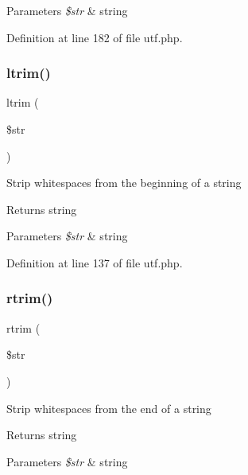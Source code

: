 \begin{DoxyParams}{Parameters}
{\em \$str} & string \\
\hline
\end{DoxyParams}


Definition at line 182 of file utf.\+php.

\hypertarget{class_u_t_f_a36a0151237d3480734de64933f769843}{}\label{class_u_t_f_a36a0151237d3480734de64933f769843} 
\subsubsection{\texorpdfstring{ltrim()}{ltrim()}}
{\footnotesize\ttfamily ltrim (\begin{DoxyParamCaption}\item[{}]{\$str }\end{DoxyParamCaption})}

Strip whitespaces from the beginning of a string \begin{DoxyReturn}{Returns}
string 
\end{DoxyReturn}

\begin{DoxyParams}{Parameters}
{\em \$str} & string \\
\hline
\end{DoxyParams}


Definition at line 137 of file utf.\+php.

\hypertarget{class_u_t_f_afa81b944f8aed770a266a9884e3e5049}{}\label{class_u_t_f_afa81b944f8aed770a266a9884e3e5049} 
\subsubsection{\texorpdfstring{rtrim()}{rtrim()}}
{\footnotesize\ttfamily rtrim (\begin{DoxyParamCaption}\item[{}]{\$str }\end{DoxyParamCaption})}

Strip whitespaces from the end of a string \begin{DoxyReturn}{Returns}
string 
\end{DoxyReturn}

\begin{DoxyParams}{Parameters}
{\em \$str} & string \\
\hline
\end{DoxyParams}


